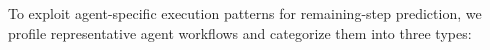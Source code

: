 To exploit agent-specific execution patterns for remaining-step prediction, we profile representative agent workflows and categorize them into three types:


